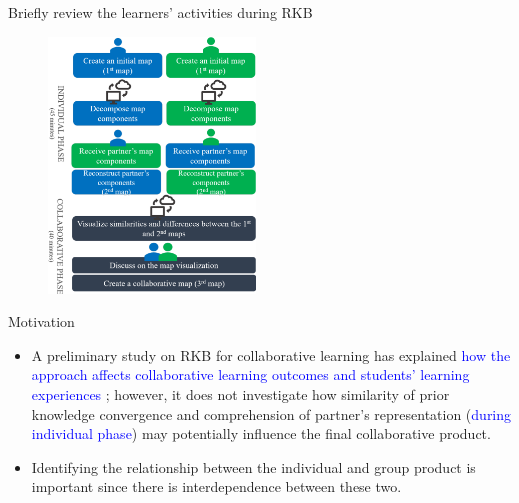 \begin{frame}{Briefly review the learners' activities during RKB}

\begin{figure}[tb]
    \begin{center}
        \includegraphics[width=55mm]{images/rqb_learner-activities.pdf}
    \end{center}
\end{figure}
       
\end{frame}

\begin{frame}{Motivation}

\begin{itemize}
    \item A preliminary study on RKB for collaborative learning has explained \textcolor{blue}{how the approach affects collaborative learning outcomes and students’ learning experiences \cite{Sadita2018PreliminaryLearning}}; however, it does not investigate how similarity of prior knowledge convergence and comprehension of partner's representation (\textcolor{blue}{during individual phase}) may potentially influence the final collaborative product.
    \item Identifying the relationship between the individual and group product is important since there is interdependence between these two. 
\end{itemize}
       
\end{frame}

